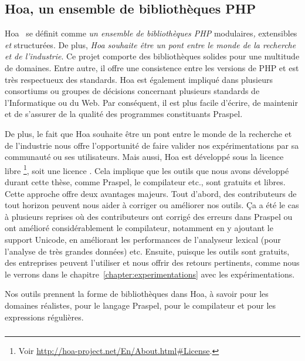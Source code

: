 \subsection{Hoa, un ensemble de bibliothèques PHP}
\label{subsection:tools:hoa}

Hoa~ se définit comme {\em un ensemble de bibliothèques PHP}
modulaires{\em , } extensibles {\em et } structurées. De plus, {\em Hoa souhaite
être un pont entre le monde de la recherche et de l'industrie}. Ce projet
comporte des bibliothèques solides pour une multitude de domaines. Entre autre,
il offre une consistence entre les versions de PHP et est très respectueux des
standards. Hoa est également impliqué dans plusieurs consortiums ou groupes de
décisions concernant plusieurs standards de l'Informatique ou du Web. Par
conséquent, il est plus facile d'écrire, de maintenir et de s'assurer de la
qualité des programmes constituants Praspel.

De plus, le fait que Hoa souhaite être un pont entre le monde de la recherche et
de l'industrie nous offre l'opportunité de faire valider nos expérimentations
par sa communauté ou ses utilisateurs. Mais aussi, Hoa est développé sous la
licence libre \footnote{Voir
\url{http://hoa-project.net/En/About.html\#License}.}, soit une licence
. Cela implique que les outils que nous avons développé
durant cette thèse, comme Praspel, le compilateur etc., sont gratuits et libres.
Cette approche offre deux avantages majeurs. Tout d'abord, des contributeurs de
tout horizon peuvent nous aider à corriger ou améliorer nos outils. Ça a été le
cas à plusieurs reprises où des contributeurs ont corrigé des erreurs dans
Praspel ou ont amélioré considérablement le compilateur, notamment en y ajoutant
le support Unicode, en améliorant les performances de l'analyseur lexical (pour
l'analyse de très grandes données) etc. Ensuite, puisque les outils sont
gratuits, des entreprises peuvent l'utiliser et nous offrir des retours
pertinents, comme nous le verrons dans le
chapitre~\ref{chapter:experimentations} avec les expérimentations.

Nos outils prennent la forme de bibliothèques dans Hoa, à savoir
 pour les domaines réalistes, 
pour le langage Praspel,  pour le compilateur et
 pour les expressions régulières.

\subsubsection{}

